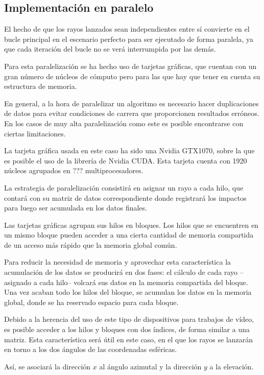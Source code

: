 \subsection{Implementación en paralelo}

El hecho de que los rayos lanzados sean independientes entre sí convierte en el bucle principal en el escenario perfecto para ser ejecutado de forma paralela, ya que cada iteración del bucle no se verá interrumpida por las demás.

Para esta paralelización se ha hecho uso de tarjetas gráficas, que cuentan con un gran número de núcleos de cómputo pero para las que hay que tener en cuenta su estructura de memoria.

En general, a la hora de paralelizar un algoritmo es necesario hacer duplicaciones de datos para evitar condiciones de carrera que proporcionen resultados erróneos.
En los casos de muy alta paralelización como este es posible encontrarse con ciertas limitaciones.

La tarjeta gráfica usada en este caso ha sido una Nvidia GTX1070, sobre la que es posible el uso de la librería de Nvidia CUDA.
Esta tarjeta cuenta con 1920 núcleos agrupados en ??? multiprocesadores.

La estrategia de paralelización consistirá en asignar un rayo a cada hilo, que contará con su matriz de datos correspondiente donde registrará los impactos para luego ser acumulada en los datos finales.

Las tarjetas gráficas agrupan sus hilos en bloques.
Los hilos que se encuentren en un mismo bloque pueden acceder a una cierta cantidad de memoria compartida de un acceso más rápido que la memoria global común.

Para reducir la necesidad de memoria y aprovechar esta característica la acumulación de los datos se producirá en dos fases: el cálculo de cada rayo --asignado a cada hilo-- volcará sus datos en la memoria compartida del bloque.
Una vez acaban todo los hilos del bloque, se acumulan los datos en la memoria global, donde se ha reservado espacio para cada bloque.

Debido a la herencia del uso de este tipo de dispositivos para trabajos de vídeo, es posible acceder a los hilos y bloques con dos índices, de forma similar a una matriz.
Esta característica será útil en este caso, en el que los rayos se lanzarán en torno a los dos ángulos de las coordenadas esféricas.

Así, se asociará la dirección $x$ al ángulo azimutal y la dirección $y$ a la elevación.

